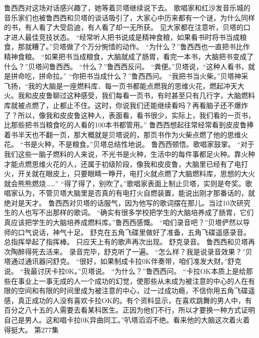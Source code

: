 \documentclass[a4paper,12pt,UTF8,twoside]{ctexbook}
\begin{document}
        鲁西西对这场对话感兴趣了，她等着贝塔继续说下去。  
        歌唱家和红沙发音乐城的音乐家们也被鲁西西和贝塔的谈话吸引了，大家心中历来都有一个谜，为什么同样的书，有人看了大受启迪，有人看了却一无所获。  
        见大家都在注意听，贝塔的口才进人最佳竞技状态。  
        “经常听人把书说成是精神食粮，如果看书时将书当成粮食，那就糟了。”贝塔做了个万分惋惜的动作。  
        “为什么？”鲁西西也一直把书比作精神食粮。  
        “如果把书当成粮食，大脑就成了肠胃，看完一本书，大脑把书变成了什么？”贝塔问鲁西西。  
        “什么？”鲁西西反问。  
        “粪便。”贝塔说，“这种人看书，就是拼命吃，拼命拉。”  
        “你把书当成什么？”鲁西西问。  
        “我把书当火柴。”贝塔神采飞扬，“我的大脑是一座燃料库．每一页书都能点燃我的思维火花，燃起冲天大火。我和皮皮鲁聊过这种感受，我们每看一页书，有时甚至只有几行字，大脑燃料库就被点燃了，止都止不住。这时，你说我们还能继续看吗？再看脑子还不爆炸了？所以，像我和皮皮鲁这种人，表面看，看书很少，实际上，我们看的一页书，比那些把书当粮食吃的人看的100本书都管用。”  
        鲁西西想起往常经常看到皮皮鲁捧着书半天也不翻一页，那大概就是贝塔说的，那页书作为火柴点燃了他的思维火花。  
        “书是火种，不是粮食。”贝塔总结性地说。  
        鲁西西顿悟。歌唱家鼓掌。  
        “对于我们这些一脑子燃料的人来说，不光书是火种，生活中的每件事都足火种。靠火种才能点燃思维火花的人，还属于初级阶段，像我和皮皮鲁，大脑里已经有了电打火，开关就在眼皮上，只要眼睛一睁开，电打火就点燃了大脑燃料库，思想的大火就会熊熊燃烧……”  
        “得了得了，别吹了。”歌唱家表面上制止贝塔，实则是夸奖。歌唱家认为，不管贝塔大脑里是否真的有电打火自燃装置，能说出刚才那番话的，就绝对是天才。  
        鲁西西对贝塔的话服气，因为他写的歌词摆在那儿。当过10次研究生的人也写不出那样的歌词。  
        “确实有很多学校把学生的大脑培养成了肠胃，它们真应该把学生的大脑培养成燃料库。”鲁西西感慨。  
        “咱们录音吧？”贝塔俨然以导师的口气说话，神气十足。  
        舒克在五角飞碟里做好了准备，五角飞碟遥感录音。  
        总指挥举起了指挥棒。  
        只应天上有的歌声再次出现。  
        舒克录音。  
        鲁西西和贝塔再次陶醉得死去活来。  
        录音完毕，舒克听了一遍。  
        “怎么样？我是说录音效果？”贝塔通过通讯器问舒克。  
        “很好，如果制成卡拉0K伴奏带，咱们准发大财。”舒克说。  
        “我最讨厌卡拉0K。”贝塔说。  
        “为什么？”鲁西西问。  
        “卡拉OK本质上是给那些在事业上一事无成的人一个成功的幻觉，使那些从未成为被注意的中心的人在有限的空间和有限的时间里成为被注意的中心，过一过成功瘾，不信你用五角飞碟遥感，真正成功的人没有喜欢卡拉OK的。有个资料显示，在喜欢跳舞的男人中，有百分之八十五的人需要去看某科医生。正因为他们不行，所以才要换一种方式证明自己是男人。这和唱卡拉0K异曲同工。”叭塔滔滔不绝。看来他的大脑这次着火着得挺大。   第277集  
\end{document}
